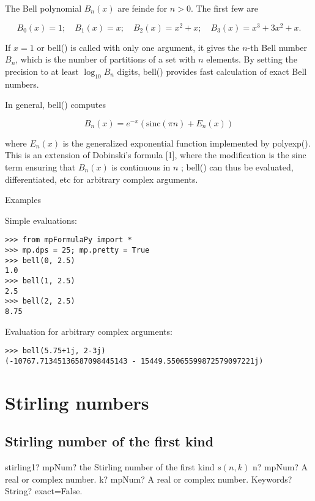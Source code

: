 \vpara
The Bell polynomial $B_n(x)$ are feinde for $n>0$. The first few are

\begin{equation}
B_0(x) = 1; \quad B_1(x)=x; \quad B_2(x) = x^2+x; \quad B_3(x) = x^3+3x^2+x.
\end{equation}

If $x=1$ or bell() is called with only one argument, it gives the $n$-th Bell number $B_n$, which is the number of partitions of a set with $n$ elements. By setting the precision to at least  $\log_{10}B_n$ digits, bell() provides fast calculation of exact Bell numbers.

In general, bell() computes

\begin{equation}
B_n(x) = e^{-x} \left(\text{sinc}(\pi n) + E_n(x)  \right)
\end{equation}

where $E_n(x)$ is the generalized exponential function implemented by polyexp(). This is an extension of Dobinski's formula [1], where the modification is the sinc term ensuring that $B_n(x)$ is continuous in $n$ ; bell() can thus be evaluated, differentiated, etc for arbitrary complex arguments.

Examples

Simple evaluations:

\begin{lstlisting}
>>> from mpFormulaPy import *
>>> mp.dps = 25; mp.pretty = True
>>> bell(0, 2.5)
1.0
>>> bell(1, 2.5)
2.5
>>> bell(2, 2.5)
8.75
\end{lstlisting}

Evaluation for arbitrary complex arguments:

\begin{lstlisting}
>>> bell(5.75+1j, 2-3j)
(-10767.71345136587098445143 - 15449.55065599872579097221j)
\end{lstlisting}



\newpage
\section{Stirling numbers}

\subsection{Stirling number of the first kind}

\begin{mpFunctionsExtract}
	\mpFunctionThree
	{stirling1? mpNum? the Stirling number of the first kind $s(n,k)$}
	{n? mpNum? A real or complex number.}
	{k? mpNum? A real or complex number.}	
	{Keywords? String? exact=False.}	
\end{mpFunctionsExtract}

